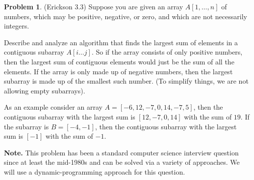 \documentclass[12pt]{article}
\theoremstyle{definition}
\newtheorem{question}{Problem}
\begin{document}
\newpage

\begin{question}(Erickson 3.3) Suppose you are given an array $A[1,\ldots, n]$ of numbers, which may be positive,
negative, or zero, and which are not necessarily integers. 

Describe and analyze an algorithm that finds the largest sum of elements
in a contiguous subarray $A[i \ldots j]$. So if the array consists of only positive numbers, then the largest sum of contiguous elements would just be the sum of all the elements.   
If the array is only made up of negative numbers, then the largest subarray is made up of the smallest such number.  (To simplify things, we are not allowing empty subarrays).

As an example consider an array $A = [-6, 12, -7, 0, 14, -7, 5]$, then the contiguous subarray with the largest sum is $[12, -7, 0, 14]$ with the sum of $19$.
If the subarray is $B=[-4, -1]$, then the contiguous subarray with the largest sum is $[-1]$ with the sum of $-1$.



\textbf{Note.} This problem has been a standard computer science interview question
since at least the mid-1980s and can be solved via a variety of approaches.  We will use a dynamic-programming approach for this question.  
\end{question}
\end{document}

